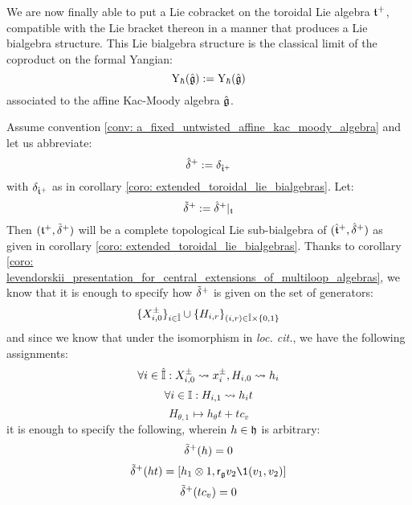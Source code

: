         We are now finally able to put a Lie cobracket on the toroidal Lie algebra $\mathfrak{t}^{+}$, compatible with the Lie bracket thereon in a manner that produces a Lie bialgebra structure. This Lie bialgebra structure is the classical limit of the coproduct on the formal Yangian:
            $$\mathrm{Y}_{\hbar}(\hat{\mathfrak{g}}) := \mathrm{Y}_{\hbar}(\hat{\mathfrak{g}})$$
        associated to the affine Kac-Moody algebra $\hat{\mathfrak{g}}$. 
        \begin{theorem} \label{theorem: toroidal_lie_bialgebras}
            Assume convention \ref{conv: a_fixed_untwisted_affine_kac_moody_algebra} and let us abbreviate:
                $$\hat{\delta}^{+} := \delta_{\hat{\mathfrak{t}}^{+}}$$
            with $\delta_{\hat{\mathfrak{t}}^{+}}$ as in corollary \ref{coro: extended_toroidal_lie_bialgebras}. Let:
                $$\tilde{\delta}^{+} := \hat{\delta}^{+}|_{\mathfrak{t}}$$
            Then $(\mathfrak{t}^{+}, \tilde{\delta}^{+})$ will be a complete topological Lie sub-bialgebra of $(\hat{\mathfrak{t}}^{+}, \hat{\delta}^{+})$ as given in corollary \ref{coro: extended_toroidal_lie_bialgebras}. Thanks to corollary \ref{coro: levendorskii_presentation_for_central_extensions_of_multiloop_algebras}, we know that it is enough to specify how $\tilde{\delta}^{+}$ is given on the set of generators:
                $$\{X_{i, 0}^{\pm}\}_{i \in \hat{\simpleroots}} \cup \{H_{i, r}\}_{ (i, r) \in \hat{\simpleroots} \x \{0, 1\} }$$
            and since we know that under the isomorphism in \textit{loc. cit.}, we have the following assignments:
                $$\forall i \in \hat{\mathbb{I}}: X_{i, 0}^{\pm} \leadsto x_i^{\pm}, H_{i, 0} \leadsto h_i$$
                $$\forall i \in \mathbb{I}: H_{i, 1} \leadsto h_i t$$
                $$H_{\theta, 1} \mapsto h_{\theta} t + t c_v$$
            it is enough to specify the following, wherein $h \in \mathfrak{h}$ is arbitrary:
                $$\tilde{\delta}^{+}(h) = 0$$
                $$\tilde{\delta}^{\positive}(ht) = [h_1 \tensor 1, \sfr_{\g} v_2 \1(v_1, v_2)]$$
                $$\tilde{\delta}^{+}(t c_v) = 0$$
        \end{theorem}
